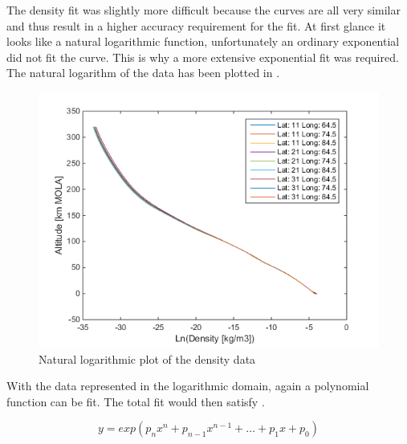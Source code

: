 The density fit was slightly more difficult because the curves are all very similar and thus result in a higher accuracy requirement for the fit. At first glance it looks like a natural logarithmic function, unfortunately an ordinary exponential did not fit the curve. This is why a more extensive exponential fit was required. The natural logarithm of the data has been plotted in .

\begin{figure}[!ht]
\centering
\includegraphics[width=1.0\textwidth]{figures/software/lnPlotDataDen.png}
\caption{Natural logarithmic plot of the density data}
\label{fig:lnPlotDataDen}
\end{figure}

With the data represented in the logarithmic domain, again a polynomial function can be fit. The total fit would then satisfy .

\begin{equation} \label{eq:expPoly}
y=exp\left( p_{n}x^{n}+p_{n-1}x^{n-1}+\dots+p_{1}x+p_{0}\right)
\end{equation}



%

